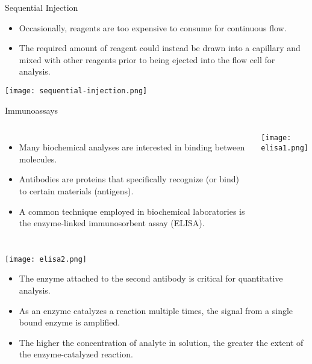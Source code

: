 \documentclass[notes=show]{beamer}
\begin{document}
\begin{frame}{Sequential Injection}
	\begin{itemize}
		\item Occasionally, reagents are too expensive to consume for
			continuous flow.
		\item The required amount of reagent could instead be drawn into
			a capillary and mixed with other reagents prior to being
			ejected into the flow cell for analysis.
	\end{itemize}

	\begin{center}
		\texttt{[image: sequential-injection.png]}
	\end{center}
\end{frame}

\begin{frame}{Immunoassays}
	\begin{columns}
		\begin{itemize}
			\item Many biochemical analyses are interested in
				binding between molecules.
			\item \alert{Antibodies} are proteins that specifically
				recognize (or bind) to certain materials
				(antigens).
			\item A common technique employed in biochemical
				laboratories is the \alert{enzyme-linked
				immunosorbent assay (ELISA)}.
		\end{itemize}
		\begin{center}
			\texttt{[image: elisa1.png]}
		\end{center}
	\end{columns}
\end{frame}

\begin{frame}
	\begin{center}
		\texttt{[image: elisa2.png]}
	\end{center}
	\begin{itemize}
		\item The enzyme attached to the second antibody is critical for
			\alert{quantitative} analysis.
		\item As an enzyme \alert{catalyzes} a reaction multiple times,
			the signal from a single bound enzyme is
			\alert{amplified}.
		\item The higher the concentration of analyte in solution, the
			greater the extent of the enzyme-catalyzed reaction.
	\end{itemize}

\end{frame}
\end{document}
